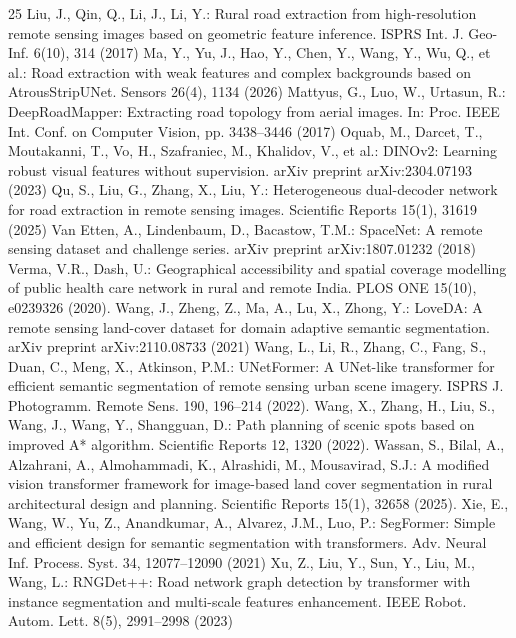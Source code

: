 \documentclass[runningheads]{llncs}
\begin{document}
\begin{thebibliography}{25}
 Liu, J., Qin, Q., Li, J., Li, Y.: Rural road extraction from high-resolution remote sensing images based on geometric feature inference. ISPRS Int. J. Geo-Inf. 6(10), 314 (2017)
 Ma, Y., Yu, J., Hao, Y., Chen, Y., Wang, Y., Wu, Q., et al.: Road extraction with weak features and complex backgrounds based on AtrousStripUNet. Sensors 26(4), 1134 (2026)
 Mattyus, G., Luo, W., Urtasun, R.: DeepRoadMapper: Extracting road topology from aerial images. In: Proc. IEEE Int. Conf. on Computer Vision, pp. 3438--3446 (2017)
 Oquab, M., Darcet, T., Moutakanni, T., Vo, H., Szafraniec, M., Khalidov, V., et al.: DINOv2: Learning robust visual features without supervision. arXiv preprint arXiv:2304.07193 (2023)
 Qu, S., Liu, G., Zhang, X., Liu, Y.: Heterogeneous dual-decoder network for road extraction in remote sensing images. Scientific Reports 15(1), 31619 (2025)
 Van Etten, A., Lindenbaum, D., Bacastow, T.M.: SpaceNet: A remote sensing dataset and challenge series. arXiv preprint arXiv:1807.01232 (2018)
 Verma, V.R., Dash, U.: Geographical accessibility and spatial coverage modelling of public health care network in rural and remote India. PLOS ONE 15(10), e0239326 (2020). 
 Wang, J., Zheng, Z., Ma, A., Lu, X., Zhong, Y.: LoveDA: A remote sensing land-cover dataset for domain adaptive semantic segmentation. arXiv preprint arXiv:2110.08733 (2021)
 Wang, L., Li, R., Zhang, C., Fang, S., Duan, C., Meng, X., Atkinson, P.M.: UNetFormer: A UNet-like transformer for efficient semantic segmentation of remote sensing urban scene imagery. ISPRS J. Photogramm. Remote Sens. 190, 196--214 (2022). 
 Wang, X., Zhang, H., Liu, S., Wang, J., Wang, Y., Shangguan, D.: Path planning of scenic spots based on improved A* algorithm. Scientific Reports 12, 1320 (2022). 
 Wassan, S., Bilal, A., Alzahrani, A., Almohammadi, K., Alrashidi, M., Mousavirad, S.J.: A modified vision transformer framework for image-based land cover segmentation in rural architectural design and planning. Scientific Reports 15(1), 32658 (2025). 
 Xie, E., Wang, W., Yu, Z., Anandkumar, A., Alvarez, J.M., Luo, P.: SegFormer: Simple and efficient design for semantic segmentation with transformers. Adv. Neural Inf. Process. Syst. 34, 12077--12090 (2021)
 Xu, Z., Liu, Y., Sun, Y., Liu, M., Wang, L.: RNGDet++: Road network graph detection by transformer with instance segmentation and multi-scale features enhancement. IEEE Robot. Autom. Lett. 8(5), 2991--2998 (2023)

\end{thebibliography}
\end{document}
